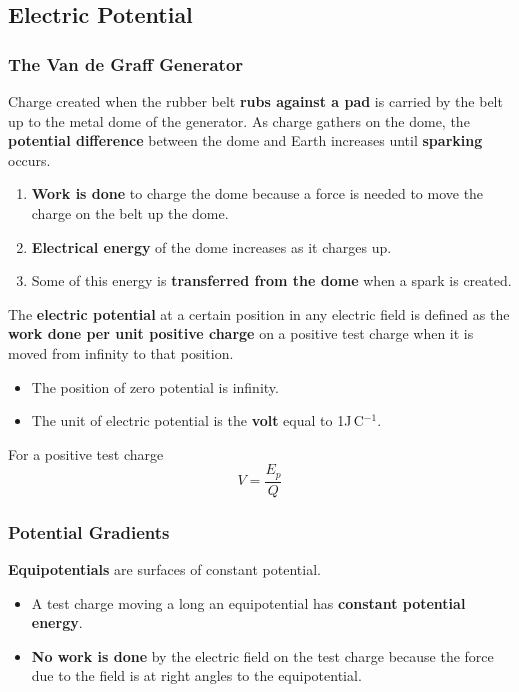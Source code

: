 \subsection{Electric Potential}

\subsubsection*{The Van de Graff Generator}

Charge created when the rubber belt \textbf{rubs against a pad} is carried by the belt up to the metal dome of the generator. As charge gathers on the dome, the \textbf{potential difference} between the dome and Earth increases until \textbf{sparking} occurs.

\begin{enumerate}
    \item \textbf{Work is done} to charge the dome because a force is needed to move the charge on the belt up the dome.
    \item \textbf{Electrical energy} of the dome increases as it charges up.
    \item Some of this energy is \textbf{transferred from the dome} when a spark is created.
\end{enumerate}

The \textbf{electric potential} at a certain position in any electric field is defined as the \textbf{work done per unit positive charge} on a positive test charge when it is moved from infinity to that position.
\begin{itemize}
    \item The position of zero potential is infinity.
    \item The unit of electric potential is the \textbf{volt} equal to 1J\,C$^{-1}$.
\end{itemize}
For a positive test charge
$$V=\frac{E_p}{Q}$$

\subsubsection*{Potential Gradients}
\textbf{Equipotentials} are surfaces of constant potential.
\begin{itemize}
    \item A test charge moving a long an equipotential has \textbf{constant potential energy}.
    \item \textbf{No work is done} by the electric field on the test charge because the force due to the field is at right angles to the equipotential.
\end{itemize}

